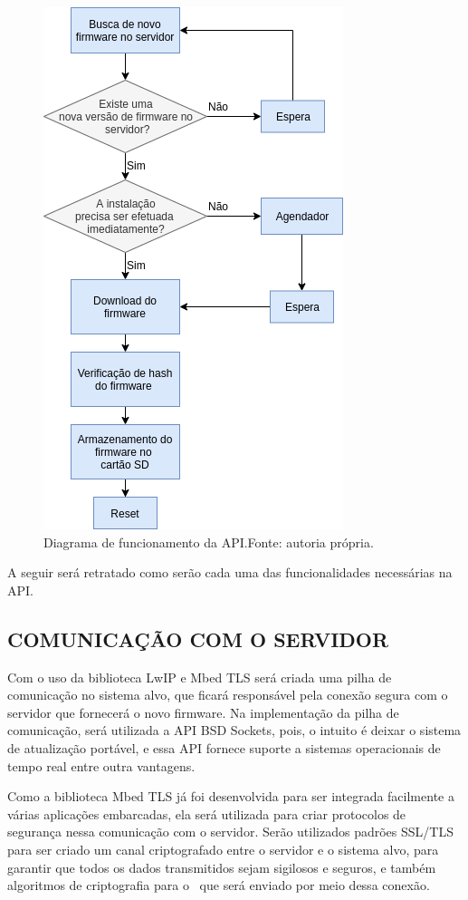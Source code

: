 \begin{figure}[H]
    \scriptsize
     \centering
     \includegraphics[scale=0.9]{dados/figuras/DiagAPI.png}
     \caption{Diagrama de funcionamento da API.\newline Fonte: autoria própria.}
     \label{fig:DiagAPI}
\end{figure}


A seguir será retratado como serão cada uma das funcionalidades necessárias na API.

\subsection{COMUNICAÇÃO COM O SERVIDOR}

Com o uso da biblioteca LwIP e Mbed TLS será criada uma pilha de comunicação no sistema alvo, que ficará responsável pela conexão segura com o servidor que fornecerá o novo firmware. Na implementação da pilha de comunicação, será utilizada a API BSD Sockets, pois, o intuito é deixar o sistema de atualização portável, e essa API fornece suporte a sistemas operacionais de tempo real entre outra vantagens.

Como a biblioteca Mbed TLS já foi desenvolvida para ser integrada facilmente a várias aplicações embarcadas, ela será utilizada para criar protocolos de segurança nessa comunicação com o servidor. Serão utilizados padrões SSL/TLS para ser criado um canal criptografado entre o servidor e o sistema alvo, para garantir que todos os dados transmitidos sejam sigilosos e seguros, e também algoritmos de criptografia para o \firmware\ que será enviado por meio dessa conexão.

